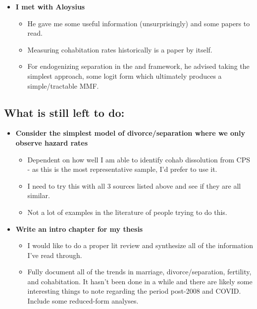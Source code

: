 \documentclass{article}
\begin{document}
\begin{itemize}
\item \textbf{I met with Aloysius}
\begin{itemize}
\item He gave me some useful information (unsurprisingly) and some papers to read.
\item Measuring cohabitation rates historically is a paper by itself.
\item For endogenizing separation in the \citet{choo2006marries} and \citet{choo2015dynamic} framework, he advised taking the simplest approach, some logit form which ultimately produces a simple/tractable MMF.
\end{itemize}



\end{itemize}

\subsection*{What is still left to do:}
\begin{itemize}
\item \textbf{Consider the simplest model of divorce/separation where we only observe hazard rates}
\begin{itemize}
\item Dependent on how well I am able to identify cohab dissolution from CPS - as this is the most representative sample, I'd prefer to use it.
\item I need to try this with all 3 sources listed above and see if they are all similar.
\item Not a lot of examples in the literature of people trying to do this.
\end{itemize}
\item \textbf{Write an intro chapter for my thesis}
\begin{itemize}
\item I would like to do a proper lit review and synthesize all of the information I've read through.
\item Fully document all of the trends in marriage, divorce/separation, fertility, and cohabitation. It hasn't been done in a while and there are likely some interesting things to note regarding the period post-2008 and COVID. Include some reduced-form analyses.

\end{itemize}
\end{itemize}

\newpage


\end{document}
